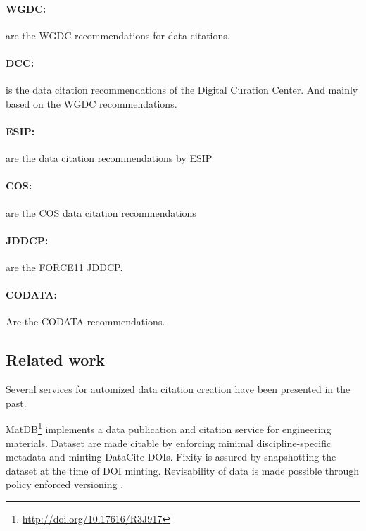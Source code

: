 \documentclass[letterpaper, parskip=half]{scrartcl}
\begin{document}
\paragraph{\acrlong{WGDC}:}
\citep{Rauber2015} are the \gls{WGDC} recommendations for data citations.

\paragraph{\acrlong{DCC}:}
\citep{Ball2015} is the data citation recommendations of the Digital Curation Center. And mainly based on the \gls{WGDC} recommendations.

\paragraph{\acrlong{ESIP}:}
\citep{ESIP2012a} are the data citation recommendations by \gls{ESIP}

\paragraph{\acrlong{COS}:}
\citep{COS2015} are the \gls{COS} data citation recommendations

\paragraph{\acrlong{JDDCP}:}
\citep{Altman2015, Rauber2015, Fenner2016, Starr2015} are the FORCE11 \gls{JDDCP}.

\paragraph{\acrlong{CODATA}:}
\citep{CODATA2013} Are the \gls{CODATA} recommendations.


\subsection{Related work}
Several services for automized data citation creation have been presented in the past. 

MatDB\footnote{\url{http://doi.org/10.17616/R3J917}} implements a data publication and citation service for engineering materials. Dataset are made citable by enforcing minimal discipline-specific metadata and minting DataCite DOIs. Fixity is assured by snapshotting the dataset at the time of DOI minting. Revisability of data is made possible through policy enforced versioning \citep{Austin2016}.
\end{document}
